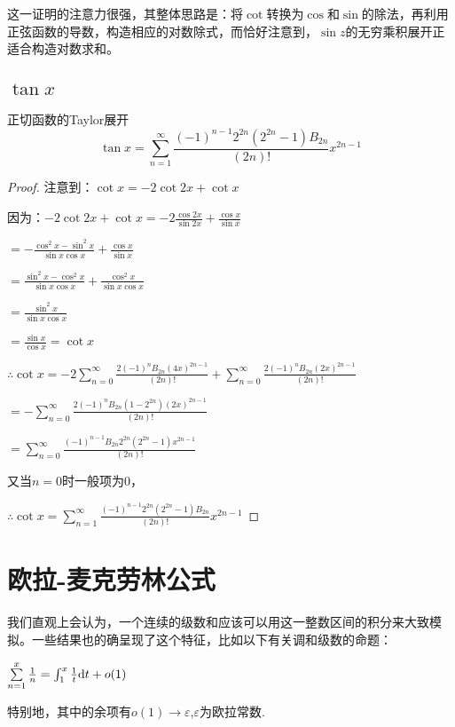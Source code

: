 \documentclass[12pt, a4paper, oneside, UTF8]{ctexbook}
\begin{document}
	这一证明的注意力很强，其整体思路是：将$\cot$转换为$\cos$和$\sin$的除法，再利用正弦函数的导数，构造相应的对数除式，而恰好注意到，$\sin z$的无穷乘积展开正适合构造对数求和。
	\subsection{$\tan x$}
	\begin{them}{正切函数的Taylor展开}{}
		\begin{equation}
			\tan x = \sum\limits_{n=1}^{\infty} \frac{(-1)^{n-1}2^{2n}(2^{2n}-1)B_{2n}}{(2n)!}x^{2n-1}
		\end{equation}
	\end{them}
	\begin{proof}
		注意到：$\cot x = -2 \cot 2x +\cot x$
		
		因为：$-2\cot 2x+\cot x = -2\frac{\cos 2x}{\sin 2x}+\frac{\cos x}{\sin x}$
		
		$=-\frac{\cos^2 x-\sin^2 x}{\sin x\cos x}+\frac{\cos x}{\sin x}$
		
		$=\frac{\sin^2 x-\cos^2 x}{\sin x\cos x}+\frac{\cos^2 x}{\sin x\cos x}$
		
		$=\frac{\sin^2 x}{\sin x\cos x}$
		
		$=\frac{\sin x}{\cos x}=\cot x$
		
		$\therefore \cot x = -2\sum\limits_{n=0}^{\infty}\frac{2(-1)^n B_{2n} (4x)^{2n-1}}{(2n)!}+\sum\limits_{n=0}^{\infty}\frac{2(-1)^n B_{2n} (2x)^{2n-1}}{(2n)!} $
		
		$=-\sum\limits_{n=0}^{\infty}\frac{2(-1)^n B_{2n} (1-2^{2n}) (2x)^{2n-1}}{(2n)!}$
		
		$=\sum\limits_{n=0}^{\infty}\frac{(-1)^{n-1} B_{2n} 2^{2n}(2^{2n}-1) x^{2n-1}}{(2n)!}$
		
		又当$n=0$时一般项为0，
		
		$\therefore \cot x = \sum\limits_{n=1}^{\infty}\frac{(-1)^{n-1} 2^{2n}(2^{2n}-1) B_{2n}}{(2n)!}  x^{2n-1}$
	\end{proof}
	\section{欧拉-麦克劳林公式}
		我们直观上会认为，一个连续的级数和应该可以用这一整数区间的积分来大致模拟。一些结果也的确呈现了这个特征，比如以下有关调和级数的命题：
		
		$\sum\limits_{n=1}^{x} \frac{1}{n} = \int_{1}^{x} \frac{1}{t}\mathrm{d} t +o(1)$
		
		特别地，其中的余项有$o(1)\to\varepsilon$,$\varepsilon$为欧拉常数.
		
\end{document}
